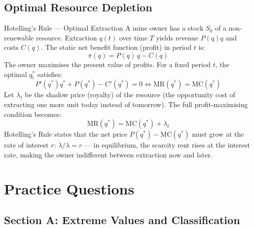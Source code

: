 \documentclass[12pt, a4paper]{article}
\theoremstyle{definition}
\begin{document}
\subsection{Optimal Resource Depletion}

\begin{exbox}{Hotelling's Rule --- Optimal Extraction}
A mine owner has a stock $S_0$ of a non-renewable resource.
Extraction $q(t)$ over time $T$ yields revenue $P(q)q$ and costs $C(q)$.
The static net benefit function (profit) in period $t$ is:
\[
  \pi(q) = P(q)\,q - C(q)
\]
The owner maximises the present value of profits.  For a fixed period $t$,
the optimal $q_t^*$ satisfies:
\[
  P'(q^*)q^* + P(q^*) - C'(q^*) = 0
  \iff \text{MR}(q^*) = \text{MC}(q^*)
\]
Let $\lambda_t$ be the shadow price (royalty) of the resource (the
opportunity cost of extracting one more unit today instead of tomorrow).
The full profit-maximising condition becomes:
\[
  \text{MR}(q^*) = \text{MC}(q^*) + \lambda_t
\]
Hotelling's Rule states that the net price $P(q^*)-\text{MC}(q^*)$ must
grow at the rate of interest $r$:
$\dot\lambda/\lambda = r$ --- in equilibrium, the scarcity rent rises at the
interest rate, making the owner indifferent between extraction now and later.
\end{exbox}

\section{Practice Questions}

\subsection{Section A: Extreme Values and Classification}
\end{document}
